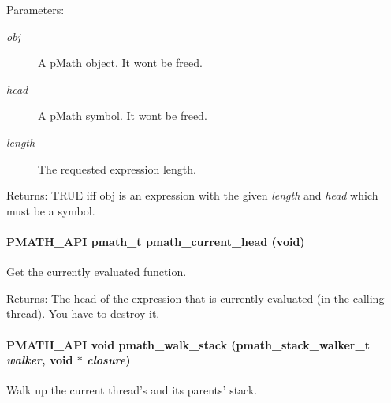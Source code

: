 \begin{Desc}
\item[Parameters:]
\begin{description}
\item[{\em obj}]A pMath object. It wont be freed. \item[{\em head}]A pMath symbol. It wont be freed. \item[{\em length}]The requested expression length. \end{description}
\end{Desc}
\begin{Desc}
\item[Returns:]TRUE iff obj is an expression with the given {\em length\/} and {\em head\/} which must be a symbol. \end{Desc}
\hypertarget{group__helpers_g70aa270956b6c8f8eb43431f9775ae88}{
\paragraph[{pmath\_\-current\_\-head}]{\setlength{\rightskip}{0pt plus 5cm}PMATH\_\-API {\bf pmath\_\-t} pmath\_\-current\_\-head (void)}\hfill}
\label{group__helpers_g70aa270956b6c8f8eb43431f9775ae88}


Get the currently evaluated function. 

\begin{Desc}
\item[Returns:]The head of the expression that is currently evaluated (in the calling thread). You have to destroy it. \end{Desc}
\hypertarget{group__helpers_g55213cb0c89952b6aacf90f36ad4047b}{
\paragraph[{pmath\_\-walk\_\-stack}]{\setlength{\rightskip}{0pt plus 5cm}PMATH\_\-API void pmath\_\-walk\_\-stack ({\bf pmath\_\-stack\_\-walker\_\-t} {\em walker}, \/  void $\ast$ {\em closure})}\hfill}
\label{group__helpers_g55213cb0c89952b6aacf90f36ad4047b}


Walk up the current thread's and its parents' stack. 

